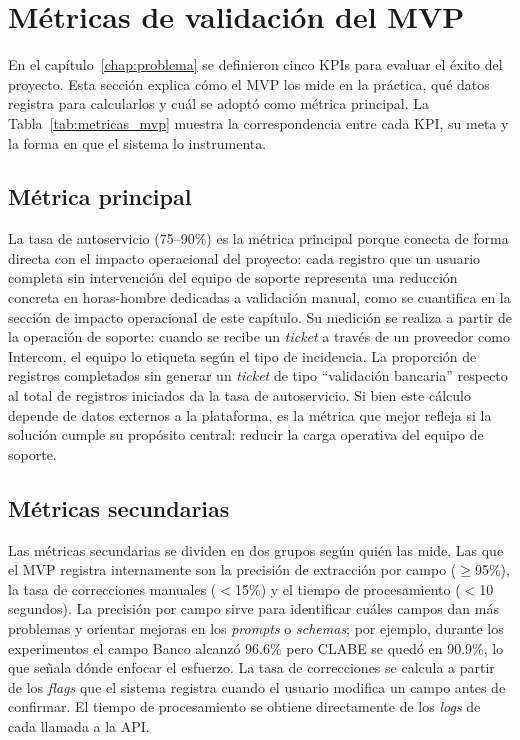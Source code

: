 \section{Métricas de validación del MVP}

En el capítulo~\ref{chap:problema} se definieron cinco KPIs para evaluar el éxito del proyecto. Esta sección explica cómo el MVP los mide en la práctica, qué datos registra para calcularlos y cuál se adoptó como métrica principal. La Tabla~\ref{tab:metricas_mvp} muestra la correspondencia entre cada KPI, su meta y la forma en que el sistema lo instrumenta.

\subsection{Métrica principal}

La tasa de autoservicio (75--90\%) es la métrica principal porque conecta de forma directa con el impacto operacional del proyecto: cada registro que un usuario completa sin intervención del equipo de soporte representa una reducción concreta en horas-hombre dedicadas a validación manual, como se cuantifica en la sección de impacto operacional de este capítulo. Su medición se realiza a partir de la operación de soporte: cuando se recibe un \textit{ticket} a través de un proveedor como Intercom, el equipo lo etiqueta según el tipo de incidencia. La proporción de registros completados sin generar un \textit{ticket} de tipo ``validación bancaria'' respecto al total de registros iniciados da la tasa de autoservicio. Si bien este cálculo depende de datos externos a la plataforma, es la métrica que mejor refleja si la solución cumple su propósito central: reducir la carga operativa del equipo de soporte.

\subsection{Métricas secundarias}

Las métricas secundarias se dividen en dos grupos según quién las mide. Las que el MVP registra internamente son la precisión de extracción por campo ($\geq$95\%), la tasa de correcciones manuales ($<$15\%) y el tiempo de procesamiento ($<$10 segundos). La precisión por campo sirve para identificar cuáles campos dan más problemas y orientar mejoras en los \textit{prompts} o \textit{schemas}; por ejemplo, durante los experimentos el campo Banco alcanzó 96.6\% pero CLABE se quedó en 90.9\%, lo que señala dónde enfocar el esfuerzo. La tasa de correcciones se calcula a partir de los \textit{flags} que el sistema registra cuando el usuario modifica un campo antes de confirmar. El tiempo de procesamiento se obtiene directamente de los \textit{logs} de cada llamada a la API.

